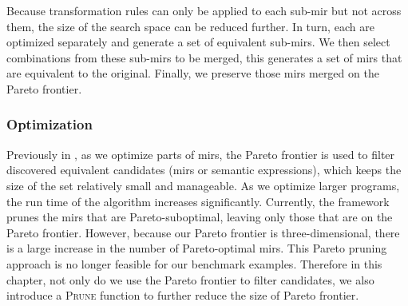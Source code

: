 Because transformation rules can only be applied to each sub-\gls{mir} but not
across them, the size of the search space can be reduced further.  In turn,
each are optimized separately and generate a set of equivalent sub-\glspl{mir}.
We then select combinations from these sub-\glspl{mir} to be merged, this
generates a set of \glspl{mir} that are equivalent to the original.  Finally,
we preserve those \glspl{mir} merged on the Pareto frontier.

\subsubsection{Optimization}



Previously in \soap, as we optimize parts of \glspl{mir}, the Pareto frontier
is used to filter discovered equivalent candidates (\glspl{mir} or semantic
expressions), which keeps the size of the set relatively small and manageable.
As we optimize larger programs, the run time of the algorithm increases
significantly.  Currently, the \soap{} framework prunes the \glspl{mir} that
are Pareto-suboptimal, leaving only those that are on the Pareto frontier.
However, because our Pareto frontier is three-dimensional, there is a large
increase in the number of Pareto-optimal \glspl{mir}.  This Pareto pruning
approach is no longer feasible for our benchmark examples.  Therefore in this
chapter, not only do we use the Pareto frontier to filter candidates, we also
introduce a \textsc{Prune} function to further reduce the size of Pareto
frontier.

